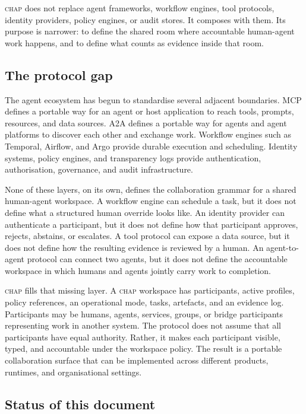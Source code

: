 \documentclass[11pt]{article}
\newcommand{\chap}{\textsc{chap}}
\begin{document}
\chap{} does not replace agent frameworks, workflow engines, tool protocols, identity providers, policy engines, or audit stores. It composes with them. Its purpose is narrower: to define the shared room where accountable human-agent work happens, and to define what counts as evidence inside that room.

\subsection{The protocol gap}

The agent ecosystem has begun to standardise several adjacent boundaries. MCP defines a portable way for an agent or host application to reach tools, prompts, resources, and data sources. A2A defines a portable way for agents and agent platforms to discover each other and exchange work. Workflow engines such as Temporal, Airflow, and Argo provide durable execution and scheduling. Identity systems, policy engines, and transparency logs provide authentication, authorisation, governance, and audit infrastructure.

None of these layers, on its own, defines the collaboration grammar for a shared human-agent workspace. A workflow engine can schedule a task, but it does not define what a structured human override looks like. An identity provider can authenticate a participant, but it does not define how that participant approves, rejects, abstains, or escalates. A tool protocol can expose a data source, but it does not define how the resulting evidence is reviewed by a human. An agent-to-agent protocol can connect two agents, but it does not define the accountable workspace in which humans and agents jointly carry work to completion.

\chap{} fills that missing layer. A \chap{} workspace has participants, active profiles, policy references, an operational mode, tasks, artefacts, and an evidence log. Participants may be humans, agents, services, groups, or bridge participants representing work in another system. The protocol does not assume that all participants have equal authority. Rather, it makes each participant visible, typed, and accountable under the workspace policy. The result is a portable collaboration surface that can be implemented across different products, runtimes, and organisational settings.

\subsection{Status of this document}
\end{document}

